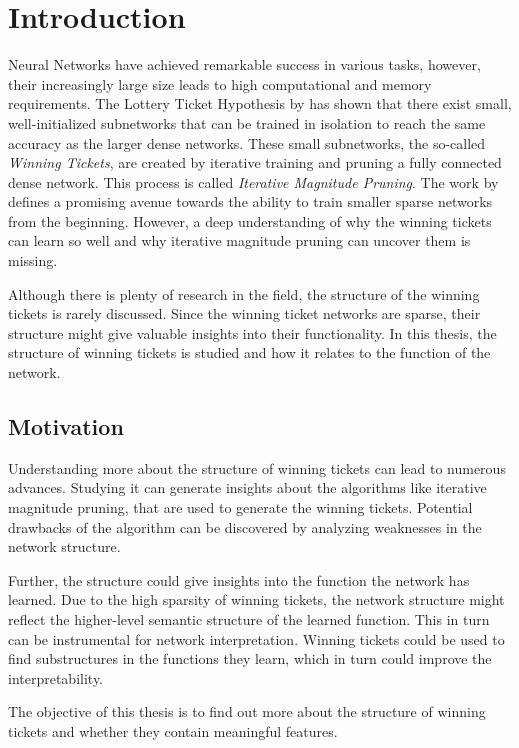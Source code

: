 \chapter{Introduction}

Neural Networks have achieved remarkable success in various tasks, however, their increasingly large size leads to high computational and memory requirements.
The Lottery Ticket Hypothesis by \textcite{LTH} has shown that there exist small, well-initialized subnetworks that can be trained in isolation to reach the same accuracy as the larger dense networks.
These small subnetworks, the so-called \textit{Winning Tickets}, are created by iterative training and pruning a fully connected dense network.
This process is called \textit{Iterative Magnitude Pruning}.
The work by \textcite{LTH} defines a promising avenue towards the ability to train smaller sparse networks from the beginning.
However, a deep understanding of why the winning tickets can learn so well and why iterative magnitude pruning can uncover them is missing.

Although there is plenty of research in the field, the structure of the winning tickets is rarely discussed.
Since the winning ticket networks are sparse, their structure might give valuable insights into their functionality.
In this thesis, the structure of winning tickets is studied and how it relates to the function of the network.

\section{Motivation}
Understanding more about the structure of winning tickets can lead to numerous advances.
Studying it can generate insights about the algorithms like iterative magnitude pruning, that are used to generate the winning tickets.
Potential drawbacks of the algorithm can be discovered by analyzing weaknesses in the network structure.

Further, the structure could give insights into the function the network has learned.
Due to the high sparsity of winning tickets, the network structure might reflect the higher-level semantic structure of the learned function.
This in turn can be instrumental for network interpretation.
Winning tickets could be used to find substructures in the functions they learn, which in turn could improve the interpretability.

The objective of this thesis is to find out more about the structure of winning tickets and whether they contain meaningful features.

